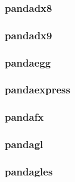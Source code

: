 \documentclass[a4paper]{article}
\begin{document}
\clearpage\subsubsection[pandadx8]{pandadx8}
\hypertarget{RefHeading20691167907073}{}\subsubsection{}
\clearpage\subsubsection[pandadx9]{pandadx9}
\hypertarget{RefHeading20711167907073}{}\subsubsection{}
\clearpage\subsubsection[pandaegg]{pandaegg}
\hypertarget{RefHeading20731167907073}{}\subsubsection{}
\clearpage\subsubsection[pandaexpress]{pandaexpress}
\hypertarget{RefHeading20751167907073}{}\subsubsection{}
\clearpage\subsubsection[pandafx]{pandafx}
\hypertarget{RefHeading20771167907073}{}\subsubsection{}
\clearpage\subsubsection[pandagl]{pandagl}
\hypertarget{RefHeading20791167907073}{}\subsubsection{}
\clearpage\subsubsection[pandagles]{pandagles}
\end{document}
